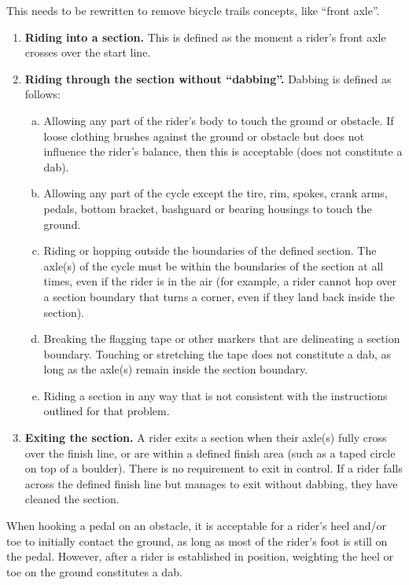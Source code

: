 \begin{framed}
This needs to be rewritten to remove bicycle trails concepts, like ``front axle''.
\end{framed}

\begin{enumerate}
\item \textbf{Riding into a section.} This is defined as the moment a rider's front axle crosses over the start line.
\item \textbf{Riding through the section without ``dabbing''.} Dabbing is defined as follows:
	\begin{enumerate}[a.]
	\item Allowing any part of the rider's body to touch the ground or obstacle. 
	If loose clothing brushes against the ground or obstacle but does not influence the rider's balance, then this is acceptable (does not constitute a dab).
	\item Allowing any part of the cycle except the tire, rim, spokes, crank arms, pedals, bottom bracket, bashguard or bearing housings to touch the ground.
	\item Riding or hopping outside the boundaries of the defined section.
	The axle(s) of the cycle must be within the boundaries of the section at all times, even if the rider is in the air (for example, a rider cannot hop over a section boundary that turns a corner, even if they land back inside the section).
	\item Breaking the flagging tape or other markers that are delineating a section boundary. 
	Touching or stretching the tape does not constitute a dab, as long as the axle(s) remain inside the section boundary.
	\item Riding a section in any way that is not consistent with the instructions outlined for that problem.
	\end{enumerate}
\item \textbf{Exiting the section.} A rider exits a section when their axle(s) fully cross over the finish line, or are within a
defined finish area (such as a taped circle on top of a boulder). 
There is no requirement to exit in control.
If a rider falls across the defined finish line but manages to exit without dabbing, they have cleaned the section.
\end{enumerate}

When hooking a pedal on an obstacle, it is acceptable for a rider's heel and/or toe to initially contact the ground, as long
as most of the rider's foot is still on the pedal. 
However, after a rider is established in position, weighting the heel or toe on the ground constitutes a dab.

